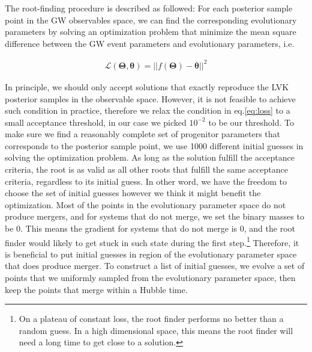 \documentclass[twocolumn]{aastex631}
\begin{document}
The root-finding procedure is described as followed:
For each posterior sample point in the GW observables space,
we can find the corresponding evolutionary parameters by solving an optimization problem that minimize the mean square difference between the GW event parameters and evolutionary parameters, i.e. 

\begin{align}
\mathcal{L}(\bm{\Theta},\bm{\theta}) = ||f(\bm{\Theta})-\bm{\theta}||^2
\label{eq:loss}
\end{align}

In principle, we should only accept solutions that exactly reproduce the LVK posterior samples in the observable space.
However, it is not feasible to achieve such condition in practice, therefore we relax the condition in eq.\ref{eq:loss} to a small acceptance threshold, in our case we picked $10^{-2}$ to be our threshold.
To make sure we find a reasonably complete set of progenitor parameters that corresponds to the posterior sample point, we use 1000 different initial guesses in solving the optimization problem.
As long as the solution fulfill the acceptance criteria, the root is as valid as all other roots that fulfill the same acceptance criteria, regardless to its initial guess.
In other word, we have the freedom to choose the set of initial guesses however we think it might benefit the optimization.
Most of the points in the evolutionary parameter space do not produce mergers, and for systems that do not merge, we set the binary masses to be 0.
This means the gradient for systems that do not merge is 0, and the root finder would likely to get stuck in such state during the first step.\footnote{On a plateau of constant loss, the root finder performs no better than a random guess. In a high dimensional space, this means the root finder will need a long time to get close to a solution.}
Therefore, it is beneficial to put initial guesses in region of the evolutionary parameter space that does produce merger.
To construct a list of initial guesses, we evolve a set of points that we uniformly sampled from the evolutionary parameter space, then keep the points that merge within a Hubble time.
\end{document}
